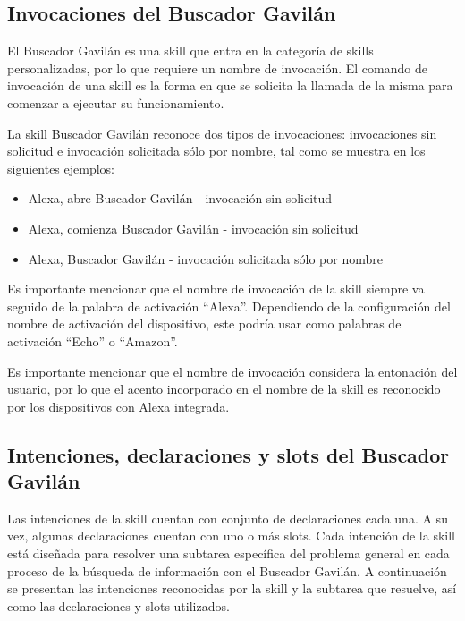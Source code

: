 
\subsection{Invocaciones del Buscador Gavilán}
\label{InvocacionesBuscadorGavilancapIV}

El Buscador Gavilán es una skill que entra en la categoría de skills personalizadas, por lo que requiere un nombre de invocación. El comando de invocación de una skill es la forma en que se solicita la llamada de la misma para comenzar a ejecutar su funcionamiento.

La skill Buscador Gavilán reconoce dos tipos de invocaciones: invocaciones sin solicitud e invocación solicitada sólo por nombre, tal como se muestra en los siguientes ejemplos:

\begin{itemize}
  \item Alexa, abre Buscador Gavilán - invocación sin solicitud
  \item Alexa, comienza Buscador Gavilán - invocación sin solicitud
  \item Alexa, Buscador Gavilán - invocación solicitada sólo por nombre
\end{itemize}

Es importante mencionar que el nombre de invocación de la skill siempre va seguido de la palabra de activación “Alexa”. Dependiendo de la configuración del nombre de activación del dispositivo, este podría usar como palabras de activación “Echo” o “Amazon”.

Es importante mencionar que el nombre de invocación considera la entonación del usuario, por lo que el acento incorporado en el nombre de la skill es reconocido por los dispositivos con Alexa integrada.


\subsection{Intenciones, declaraciones y slots del Buscador Gavilán}
\label{IntencionesDeclaracionesSlotscapIV}

Las intenciones de la skill cuentan con conjunto de declaraciones cada una. A su vez, algunas declaraciones cuentan con uno o más slots. Cada intención de la skill está diseñada para resolver una subtarea específica del problema general en cada proceso de la búsqueda de información con el Buscador Gavilán. A continuación se presentan las intenciones reconocidas por la skill y la subtarea que resuelve, así como las declaraciones y slots utilizados.

